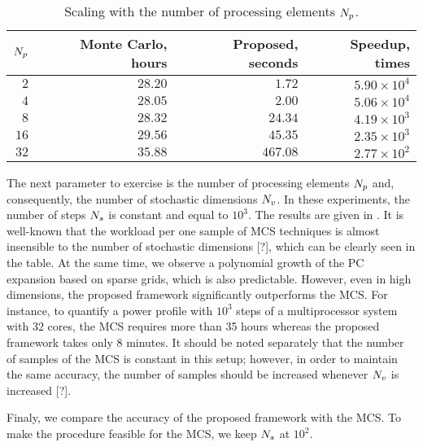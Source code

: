 \begin{table}
  \centering
  \caption{Scaling with the number of processing elements ${N_p}$.}
  \vspace{-10pt}
  \begin{tabular}{|r|r|r|r|}
    \hline
    ${N_p}$ & Monte Carlo, hours & Proposed, seconds & Speedup, times \\
    \hline
    $ 2$ & $28.20$ & $  1.72$ & $5.90 \times 10^4$ \\
    $ 4$ & $28.05$ & $  2.00$ & $5.06 \times 10^4$ \\
    $ 8$ & $28.32$ & $ 24.34$ & $4.19 \times 10^3$ \\
    $16$ & $29.56$ & $ 45.35$ & $2.35 \times 10^3$ \\
    $32$ & $35.88$ & $467.08$ & $2.77 \times 10^2$ \\
    \hline
  \end{tabular}
  \vspace{-10pt}
\end{table}
The next parameter to exercise is the number of processing elements ${N_p}$ and, consequently, the number of stochastic dimensions ${N_v}$. In these experiments, the number of steps ${N_s}$ is constant and equal to $10^3$. The results are given in . It is well-known that the workload per one sample of MCS techniques is almost insensible to the number of stochastic dimensions [?], which can be clearly seen in the table. At the same time, we observe a polynomial growth \cite{heiss2008} of the PC expansion based on sparse grids, which is also predictable. However, even in high dimensions, the proposed framework significantly outperforms the MCS. For instance, to quantify a power profile with $10^3$ steps of a multiprocessor system with 32 cores, the MCS requires more than 35 hours whereas the proposed framework takes only 8 minutes. It should be noted separately that the number of samples of the MCS is constant in this setup; however, in order to maintain the same accuracy, the number of samples should be increased whenever ${N_v}$ is increased [?].

Finaly, we compare the accuracy of the proposed framework with the MCS. To make the procedure feasible for the MCS, we keep ${N_s}$ at $10^2$.
